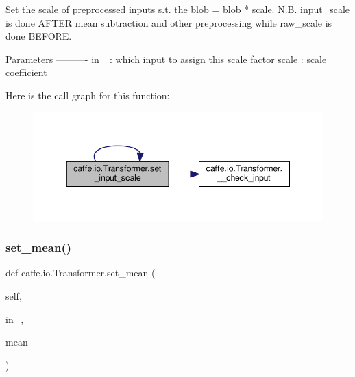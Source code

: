\begin{DoxyVerb}Set the scale of preprocessed inputs s.t. the blob = blob * scale.
N.B. input_scale is done AFTER mean subtraction and other preprocessing
while raw_scale is done BEFORE.

Parameters
----------
in_ : which input to assign this scale factor
scale : scale coefficient
\end{DoxyVerb}
 Here is the call graph for this function\+:
\nopagebreak
\begin{figure}[H]
\begin{center}
\leavevmode
\includegraphics[width=344pt]{classcaffe_1_1io_1_1_transformer_ab3d72541298e2fb73a884df37e56f65c_cgraph}
\end{center}
\end{figure}
\mbox{\label{classcaffe_1_1io_1_1_transformer_a7064401b3aa295a6ab61895563a60d16}} 
\subsubsection{\texorpdfstring{set\+\_\+mean()}{set\_mean()}\hspace{0.1cm}{\footnotesize\ttfamily [1/2]}}
{\footnotesize\ttfamily def caffe.\+io.\+Transformer.\+set\+\_\+mean (\begin{DoxyParamCaption}\item[{}]{self,  }\item[{}]{in\+\_\+,  }\item[{}]{mean }\end{DoxyParamCaption})}

